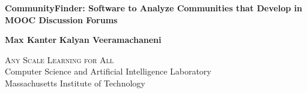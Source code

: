 \begin{titlepage}
\begin{center}


{ \Large\bfseries CommunityFinder: Software to Analyze Communities that Develop in MOOC Discussion Forums}\\

\vspace{2cm}
 
{\large \bf Max Kanter}
{\large \bf Kalyan Veeramachaneni}



 \textsc{Any Scale Learning for All}\\
 Computer Science and Artificial Intelligence Laboratory\\
 Massachusetts Institute of Technology

\end{center}
\end{titlepage}

